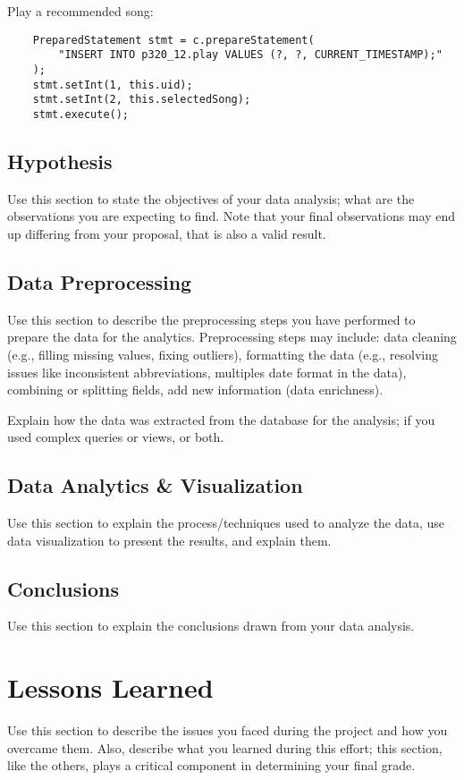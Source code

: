 \documentclass[12pt]{article}
\begin{document}
    
    Play a recommended song:
    
    \begin{lstlisting}
    PreparedStatement stmt = c.prepareStatement(
        "INSERT INTO p320_12.play VALUES (?, ?, CURRENT_TIMESTAMP);"
    );
    stmt.setInt(1, this.uid);
    stmt.setInt(2, this.selectedSong);
    stmt.execute();
    \end{lstlisting}
    
    
    
    \subsection{Hypothesis}
    Use this section to state the objectives of your data analysis; what are the observations you are expecting to find. Note that your final
    observations may end up differing from your proposal, that is also a valid result.
    \subsection{Data Preprocessing}
    Use this section to describe the preprocessing steps you have performed to prepare the data for the analytics. Preprocessing steps may include: data cleaning (e.g., filling missing values, fixing outliers), formatting the data (e.g., resolving issues like inconsistent abbreviations, multiples date format in the data), combining or splitting fields, add new information (data enrichness).

    Explain how the data was extracted from the database for the analysis; if you used complex queries or views, or both.
    \subsection{Data Analytics \& Visualization}
    Use this section to explain the process/techniques used to analyze the data, use data visualization to present the results, and explain them.
    \subsection{Conclusions}
    Use this section to explain the conclusions drawn from your data analysis.\\
    \section{Lessons Learned}
    Use this section to describe the issues you faced during the project and how you overcame them. Also, describe what you learned during this effort; this section, like the others, plays a critical component in determining your final grade.\\
\end{document}
